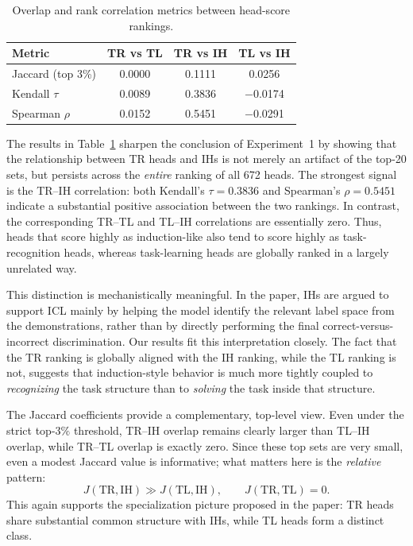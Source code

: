 \documentclass[twoside,english]{article}
\begin{document}
\begin{table}[h]
\centering
\caption{Overlap and rank correlation metrics between head-score rankings.}
\begin{tabular}{lccc}
\toprule
\textbf{Metric} & \textbf{TR vs TL} & \textbf{TR vs IH} & \textbf{TL vs IH} \\
\midrule
Jaccard (top 3\%) & 0.0000 & 0.1111 & 0.0256 \\
Kendall $\tau$ & 0.0089 & 0.3836 & $-$0.0174 \\
Spearman $\rho$ & 0.0152 & 0.5451 & $-$0.0291 \\
\bottomrule
\end{tabular}
\label{tab:overlap}
\end{table}

The results in Table~\ref{tab:overlap} sharpen the conclusion of Experiment~1 by showing that the relationship between TR heads and IHs is not merely an artifact of the top-20 sets, but persists across the \emph{entire} ranking of all 672 heads. The strongest signal is the TR--IH correlation: both Kendall's \(\tau = 0.3836\) and Spearman's \(\rho = 0.5451\) indicate a substantial positive association between the two rankings. In contrast, the corresponding TR--TL and TL--IH correlations are essentially zero. Thus, heads that score highly as induction-like also tend to score highly as task-recognition heads, whereas task-learning heads are globally ranked in a largely unrelated way.

This distinction is mechanistically meaningful. In the paper, IHs are argued to support ICL mainly by helping the model identify the relevant label space from the demonstrations, rather than by directly performing the final correct-versus-incorrect discrimination. Our results fit this interpretation closely. The fact that the TR ranking is globally aligned with the IH ranking, while the TL ranking is not, suggests that induction-style behavior is much more tightly coupled to \emph{recognizing} the task structure than to \emph{solving} the task inside that structure.

The Jaccard coefficients provide a complementary, top-level view. Even under the strict top-\(3\%\) threshold, TR--IH overlap remains clearly larger than TL--IH overlap, while TR--TL overlap is exactly zero. Since these top sets are very small, even a modest Jaccard value is informative; what matters here is the \emph{relative} pattern:
\[
J(\mathrm{TR},\mathrm{IH}) \gg J(\mathrm{TL},\mathrm{IH}), \qquad
J(\mathrm{TR},\mathrm{TL}) = 0.
\]
This again supports the specialization picture proposed in the paper: TR heads share substantial common structure with IHs, while TL heads form a distinct class.
\end{document}
